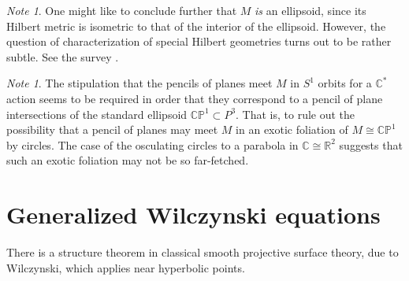 \documentclass[11pt]{article}
\numberwithin{equation}{section}
\newcounter{count}
\theoremstyle{plain}
\theoremstyle{remark}
\newtheorem{note}[count]{Note}
\newcommand{\R}{\mathbb{R}}
\begin{document}
\begin{note} One might like to conclude further that $M$ \emph{is} an ellipsoid, since its Hilbert metric is isometric to that of the interior of the ellipsoid. However, the question of characterization of special Hilbert geometries turns out to be rather subtle. See the survey \cite{guo}.
\end{note}

\begin{note} The stipulation that the pencils of planes meet $M$ in $S^{1}$ orbits for a $\mathbb{C}^{*}$ action seems to be required in order that they correspond to a pencil of plane intersections of the standard ellipsoid $\mathbb{CP}^{1}\subset P^{3}$. That is, to rule out the possibility that a pencil of planes may meet $M$ in an exotic foliation of $M\cong \mathbb{CP}^{1}$ by circles. The case of the osculating circles to a parabola in $\mathbb{C}\cong \R^{2}$ suggests that such an exotic foliation may not be so far-fetched.
\end{note}

\section{Generalized Wilczynski equations}\label{genwil}


There is a structure theorem in classical smooth projective surface theory, due to Wilczynski, which applies near hyperbolic points.

\end{document}
